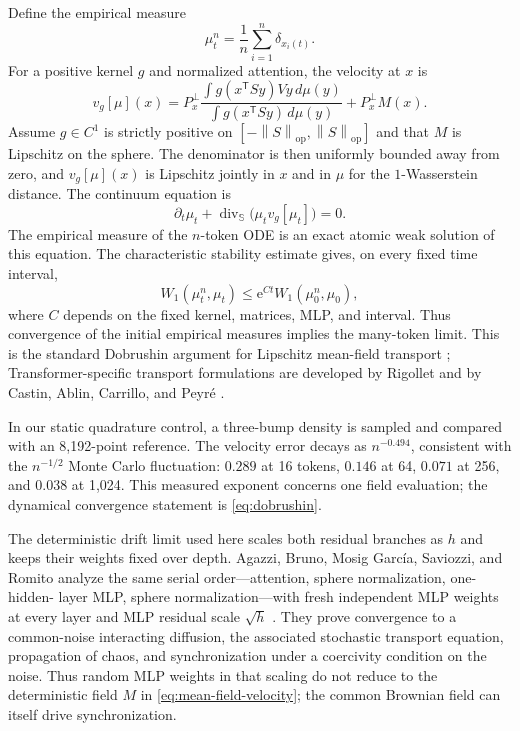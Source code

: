 \documentclass[11pt,a4paper]{article}
\theoremstyle{definition}
\newcommand{\sphere}{\mathbb S}
\newcommand{\T}{\mathsf T}
\newcommand{\e}{\mathrm e}
\newcommand{\norm}[1]{\left\lVert #1\right\rVert}
\begin{document}
Define the empirical measure
\[
 \mu_t^n=\frac1n\sum_{i=1}^n\delta_{x_i(t)}.
\]
For a positive kernel $g$ and normalized attention, the velocity at $x$ is
\begin{equation}
 v_g[\mu](x)=P_x^{\perp}
 \frac{\int g(x^{\T}Sy)Vy\,d\mu(y)}
 {\int g(x^{\T}Sy)\,d\mu(y)}+P_x^{\perp}M(x).\label{eq:mean-field-velocity}
\end{equation}
Assume $g\in C^1$ is strictly positive on
$[-\norm{S}_{\mathrm{op}},\norm{S}_{\mathrm{op}}]$ and that $M$ is Lipschitz on the
sphere.  The denominator is then uniformly bounded away from zero, and
$v_g[\mu](x)$ is Lipschitz jointly in $x$ and in $\mu$ for the $1$-Wasserstein
distance.  The continuum equation is
\begin{equation}
 \partial_t\mu_t+\operatorname{div}_{\sphere}
 \bigl(\mu_t v_g[\mu_t]\bigr)=0.\label{eq:transport}
\end{equation}
The empirical measure of the $n$-token ODE is an exact atomic weak solution of this
equation.  The characteristic stability estimate gives, on every fixed time interval,
\begin{equation}
 W_1(\mu_t^n,\mu_t)\leq \e^{Ct}W_1(\mu_0^n,\mu_0),
 \label{eq:dobrushin}
\end{equation}
where $C$ depends on the fixed kernel, matrices, MLP, and interval.  Thus convergence
of the initial empirical measures implies the many-token limit.  This is the standard
Dobrushin argument for Lipschitz mean-field transport
\cite{dobrushin1979vlasov}; Transformer-specific transport formulations are developed
by Rigollet and by Castin, Ablin, Carrillo, and Peyr\'e
\cite{rigollet2025meanfield,castin2025unified}.

In our static quadrature control, a three-bump density is sampled and compared with an
8,192-point reference. The velocity error decays as $n^{-0.494}$, consistent with the
$n^{-1/2}$ Monte Carlo fluctuation: $0.289$ at 16 tokens, $0.146$ at 64, $0.071$ at
256, and $0.038$ at 1,024.  This measured exponent concerns one field evaluation; the
dynamical convergence statement is \eqref{eq:dobrushin}.

The deterministic drift limit used here scales both residual branches as $h$ and
keeps their weights fixed over depth.  Agazzi, Bruno, Mosig Garc\'ia, Saviozzi, and
Romito analyze the same serial order---attention, sphere normalization, one-hidden-
layer MLP, sphere normalization---with fresh independent MLP weights at every layer
and MLP residual scale $\sqrt h$ \cite{agazzi2026stochastic}.  They prove convergence
to a common-noise interacting diffusion, the associated stochastic transport
equation, propagation of chaos, and synchronization under a coercivity condition on
the noise.  Thus random MLP weights in that scaling do not reduce to the deterministic
field $M$ in \eqref{eq:mean-field-velocity}; the common Brownian field can itself drive
synchronization.
\end{document}
